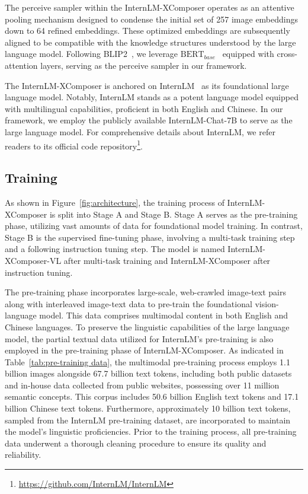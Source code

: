 \documentclass[10pt,twocolumn,letterpaper]{article}
\begin{document}
 The perceive sampler within the InternLM-XComposer operates as an attentive pooling mechanism designed to condense the initial set of 257 image embeddings down to 64 refined embeddings. These optimized embeddings are subsequently aligned to be compatible with the knowledge structures understood by the large language model. Following BLIP2~\cite{Li2023BLIP2BL}, we leverage $\text{BERT}_{base}$~\cite{devlin2018bert} equipped with cross-attention layers, serving as the perceive sampler in our framework.

 The InternLM-XComposer is anchored on InternLM~\cite{2023internlm} as its foundational large language model. Notably, InternLM stands as a potent language model equipped with multilingual capabilities, proficient in both English and Chinese. In our framework, we employ the publicly available InternLM-Chat-7B to serve as the large language model. For comprehensive details about InternLM, we refer readers to its official code repository\footnote{\url{https://github.com/InternLM/InternLM}}.

\subsection{Training}
As shown in Figure~\ref{fig:architecture}, the training process of InternLM-XComposer is split into Stage A and Stage B. Stage A serves as the pre-training phase, utilizing vast amounts of data for foundational model training. 
In contrast, Stage B is the supervised fine-tuning phase, involving a multi-task training step and a following instruction tuning step. 
The model is named InternLM-XComposer-VL after multi-task training and InternLM-XComposer after instruction tuning.

 The pre-training phase incorporates large-scale, web-crawled image-text pairs along with interleaved image-text data to pre-train the foundational vision-language model. This data comprises multimodal content in both English and Chinese languages. To preserve the linguistic capabilities of the large language model, the partial textual data utilized for InternLM's pre-training is also employed in the pre-training phase of InternLM-XComposer. As indicated in Table~\ref{tab:pre-training data}, the multimodal pre-training process employs 1.1 billion images alongside 67.7 billion text tokens, including both public datasets and in-house data collected from public websites, possessing over 11 million semantic concepts. This corpus includes 50.6 billion English text tokens and 17.1 billion Chinese text tokens. Furthermore, approximately 10 billion text tokens, sampled from the InternLM pre-training dataset, are incorporated to maintain the model's linguistic proficiencies. Prior to the training process, all pre-training data underwent a thorough cleaning procedure to ensure its quality and reliability.
\end{document}
